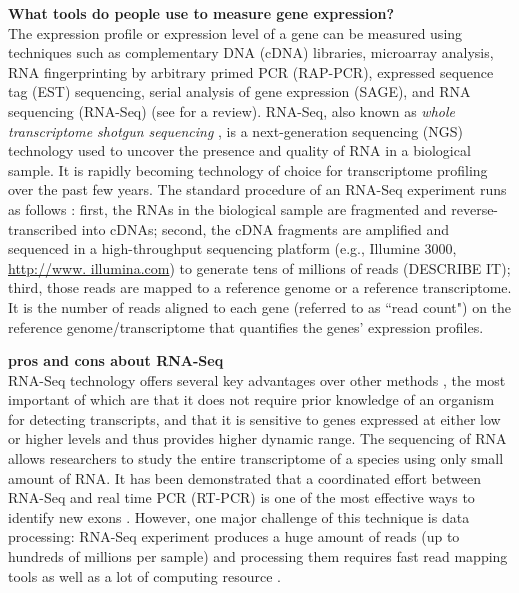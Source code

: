 \textbf{What tools do people use to measure gene expression?}\\
The expression profile or expression level of a gene can be measured using techniques such as
complementary DNA (cDNA) libraries, microarray analysis, RNA fingerprinting by arbitrary primed PCR
(RAP-PCR), expressed sequence tag (EST) sequencing, serial analysis of gene expression (SAGE), and
RNA sequencing (RNA-Seq) (see \cite{casassola2013gene} for a review).
RNA-Seq, also known as \textit{whole transcriptome shotgun sequencing}
\citep{morin2008profiling}, is a next-generation sequencing (NGS) technology used to uncover the
presence and quality of RNA in a biological sample.  It is rapidly becoming technology of choice
for transcriptome profiling over the past few years. 
The standard procedure of an RNA-Seq experiment runs as follows 
\citep{finotello2015measuring}: first, the RNAs in the biological sample are fragmented and
reverse-transcribed into cDNAs; second, the cDNA fragments are amplified and sequenced in a
high-throughput sequencing platform (e.g., Illumine 3000, \url{http://www. illumina.com}) to
generate tens of millions of reads (DESCRIBE IT); third, those reads are mapped to a reference
genome
or a reference transcriptome.
It is the number of reads aligned to each gene (referred to as ``read count") on the reference
genome/transcriptome that quantifies the genes' expression profiles.  


\textbf{pros and cons about RNA-Seq}\\
RNA-Seq technology offers several key advantages over other methods \citep{wang2009rna}, the most
important of which are that it does not require prior knowledge of an organism for detecting
transcripts,  and that it is sensitive to genes expressed at either low or higher levels and thus
provides higher dynamic range. The sequencing of RNA allows researchers to study the entire
transcriptome of a species using only small amount of RNA. It has been demonstrated that a
coordinated effort between RNA-Seq and real time PCR (RT-PCR) is one of the most effective ways to
identify new exons \citep{howald2012combining}. However, one major challenge of this technique is
data processing: RNA-Seq experiment produces a huge amount of reads (up to hundreds of
millions per sample) and processing them requires fast read mapping tools as well
as a lot of computing resource
\citep{langmead2009ultrafast,li2010fast}.



